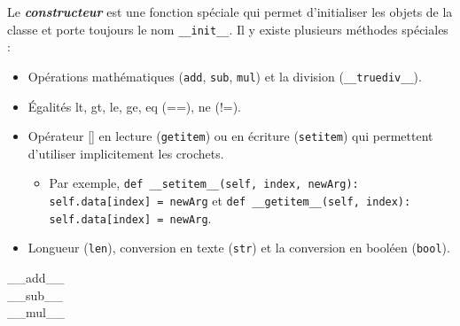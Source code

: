 \documentclass[10pt, french]{article}
\begin{document}
\begin{multicols*}{2}
Le \textbf{\textit{constructeur}} est une fonction spéciale qui permet d'initialiser les objets de la classe et porte toujours le nom \texttt{\_\_init\_\_}. Il y existe plusieurs méthodes spéciales : 
\begin{itemize}
	\item	Opérations mathématiques (\texttt{add}, \texttt{sub}, \texttt{mul}) et la division (\texttt{\_\_truediv\_\_}).
	\item	Égalités lt, gt, le, ge, eq (==), ne (!=).
	\item	Opérateur [] en lecture (\texttt{getitem}) ou en écriture (\texttt{setitem}) qui permettent d'utiliser implicitement les crochets.
		\begin{itemize}
		\item	Par exemple, \texttt{def \_\_setitem\_\_(self, index, newArg): self.data[index] = newArg} et \texttt{def \_\_getitem\_\_(self, index): self.data[index] = newArg}.
		\end{itemize}
	\item	Longueur (\texttt{len}), conversion en texte (\texttt{str}) et la conversion en booléen (\texttt{bool}).
\end{itemize}
\begin{description}
	\item[\_\_add\_\_]
	\item[\_\_sub\_\_]
	\item[\_\_mul\_\_]
\end{description}


\end{multicols*}
\end{document}
